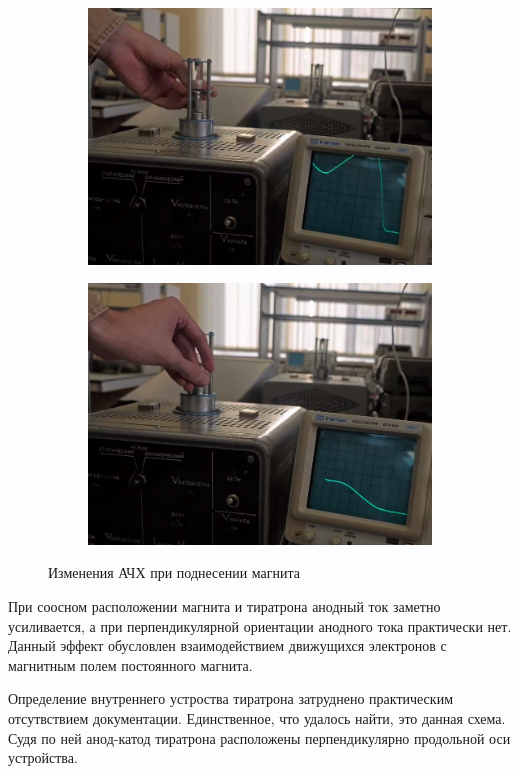 \documentclass[14pt, a4paper]{report}
\begin{document}
\begin{enumerate}
\begin{figure}[H]
\centering
\begin{subfigure}{.5\textwidth}
  \centering
  \includegraphics[width=.9\linewidth]{../images/513-8a}
\end{subfigure}%
\begin{subfigure}{.5\textwidth}
  \centering
  \includegraphics[width=.9\linewidth]{../images/513-8b}
\end{subfigure}
\caption{Изменения АЧХ при поднесении магнита}
\end{figure}

При соосном расположении магнита и тиратрона анодный ток заметно усиливается, а при перпендикулярной ориентации анодного тока практически нет. Данный эффект обусловлен взаимодействием движущихся электронов с магнитным полем постоянного магнита.

Определение внутреннего устроства тиратрона затруднено практическим отсутвствием документации. Единственное, что удалось найти, это данная схема. Судя по ней анод-катод тиратрона расположены перпендикулярно продольной оси устройства. 


\end{enumerate}
\end{document}

